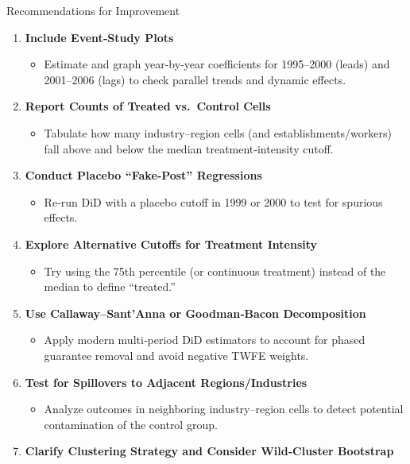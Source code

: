 \documentclass{beamer}
\begin{document}
\begin{frame}{Recommendations for Improvement}
  \begin{enumerate}
    \item \textbf{Include Event‐Study Plots}
      \begin{itemize}
        \item Estimate and graph year‐by‐year coefficients for 1995–2000 (leads) and 2001–2006 (lags) to check parallel trends and dynamic effects.
      \end{itemize}
    \item \textbf{Report Counts of Treated vs.\ Control Cells}
      \begin{itemize}
        \item Tabulate how many industry–region cells (and establishments/workers) fall above and below the median treatment‐intensity cutoff.
      \end{itemize}
    \item \textbf{Conduct Placebo “Fake‐Post” Regressions}
      \begin{itemize}
        \item Re‐run DiD with a placebo cutoff in 1999 or 2000 to test for spurious effects.
      \end{itemize}
    \item \textbf{Explore Alternative Cutoffs for Treatment Intensity}
      \begin{itemize}
        \item Try using the 75th percentile (or continuous treatment) instead of the median to define “treated.”
      \end{itemize}
    \item \textbf{Use Callaway–Sant’Anna or Goodman‐Bacon Decomposition}
      \begin{itemize}
        \item Apply modern multi‐period DiD estimators to account for phased guarantee removal and avoid negative TWFE weights.
      \end{itemize}
    \item \textbf{Test for Spillovers to Adjacent Regions/Industries}
      \begin{itemize}
        \item Analyze outcomes in neighboring industry–region cells to detect potential contamination of the control group.
      \end{itemize}
    \item \textbf{Clarify Clustering Strategy and Consider Wild‐Cluster Bootstrap}

\end{enumerate}
\end{frame}
\end{document}
